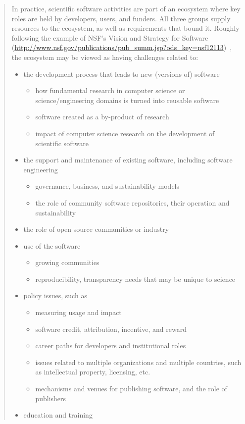 \documentclass[11pt, oneside]{amsart}
\begin{document}
\begin{quote}
In practice, scientific software activities are part of an ecosystem where key roles are held by 
developers, users, and funders. All three groups supply resources to the ecosystem, as well as 
requirements that bound it. Roughly following the example of NSF's Vision and Strategy for Software 
(\url{http://www.nsf.gov/publications/pub_summ.jsp?ods_key=nsf12113})~\cite{NSF_software_vision}, 
the ecosystem may be viewed as having challenges related to:

\begin{itemize}
\item the development process that leads to new (versions of) software
\begin{itemize}
\item how fundamental research in computer science or science/engineering domains is turned  into reusable software
\item software created as a by-product of research
\item impact of computer science research on the development of scientific software
\end{itemize}
\item the support and maintenance of existing software, including software engineering
\begin{itemize}
\item governance, business, and sustainability models
\item the role of community software repositories, their operation and sustainability
\end{itemize}
\item the role of open source communities or industry
\item use of the software
\begin{itemize}
\item growing communities
\item reproducibility, transparency needs that may be unique to science
\end{itemize}
\item policy issues, such as
\begin{itemize}
\item measuring usage and impact
\item software credit, attribution, incentive, and reward
\item career paths for developers and institutional roles
\item issues related to multiple organizations and multiple countries, such as intellectual property, licensing, etc.
\item mechanisms and venues for publishing software, and the role of publishers
\end{itemize}
\item education and training
\end{itemize}

\end{quote}
\end{document}
